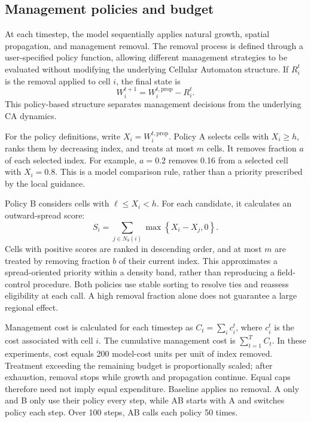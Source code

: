 \documentclass[a4paper,11pt]{article}
\begin{document}
\subsection{Management policies and budget}

At each timestep, the model sequentially applies natural growth, spatial propagation, and management removal. The removal process is defined through a user-specified policy function, allowing different management strategies to be evaluated without modifying the underlying Cellular Automaton structure. If $R_i^t$ is the removal applied to cell $i$, the final state is
\begin{equation}
W_i^{t+1}=W_i^{t,\mathrm{prop}}-R_i^t.
\end{equation}
This policy-based structure separates management decisions from the underlying CA dynamics.

For the policy definitions, write $X_i=W_i^{t,\mathrm{prop}}$. Policy A selects cells with $X_i\geq h$, ranks them by decreasing index, and treats at most $m$ cells. It removes fraction $a$ of each selected index. For example, $a=0.2$ removes 0.16 from a selected cell with $X_i=0.8$. This is a model comparison rule, rather than a priority prescribed by the local guidance.

Policy B considers cells with $\ell\leq X_i<h$. For each candidate, it calculates an outward-spread score:
\begin{equation}
S_i=\sum_{j\in N_8(i)}\max\!\left\{X_i-X_j,0\right\}.
\label{eq:score}
\end{equation}
Cells with positive scores are ranked in descending order, and at most $m$ are treated by removing fraction $b$ of their current index. This approximates a spread-oriented priority within a density band, rather than reproducing a field-control procedure. Both policies use stable sorting to resolve ties and reassess eligibility at each call. A high removal fraction alone does not guarantee a large regional effect.

Management cost is calculated for each timestep as $C_t=\sum_i c_i^t$, where $c_i^t$ is the cost associated with cell $i$. The cumulative management cost is $\sum_{t=1}^{T}C_t$. In these experiments, cost equals 200 model-cost units per unit of index removed. Treatment exceeding the remaining budget is proportionally scaled; after exhaustion, removal stops while growth and propagation continue. Equal caps therefore need not imply equal expenditure. Baseline applies no removal. A only and B only use their policy every step, while AB starts with A and switches policy each step. Over 100 steps, AB calls each policy 50 times.
\end{document}
